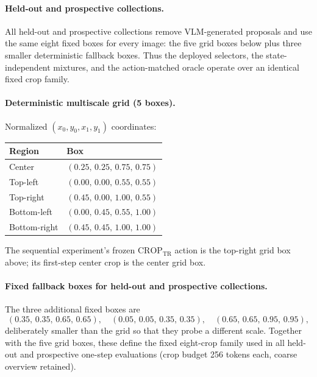 \documentclass[10pt]{article}
\begin{document}
\paragraph{Held-out and prospective collections.}
All held-out and prospective collections remove VLM-generated proposals and
use the same eight fixed boxes for every image: the five grid boxes below
plus three smaller deterministic fallback boxes. Thus the deployed selectors,
the state-independent mixtures, and the action-matched oracle operate over
an identical fixed crop family.

\paragraph{Deterministic multiscale grid (5 boxes).}
Normalized $(x_0, y_0, x_1, y_1)$ coordinates:
\begin{center}
\begin{tabular}{ll}
\toprule
Region & Box \\
\midrule
Center       & $(0.25,\,0.25,\,0.75,\,0.75)$ \\
Top-left     & $(0.00,\,0.00,\,0.55,\,0.55)$ \\
Top-right    & $(0.45,\,0.00,\,1.00,\,0.55)$ \\
Bottom-left  & $(0.00,\,0.45,\,0.55,\,1.00)$ \\
Bottom-right & $(0.45,\,0.45,\,1.00,\,1.00)$ \\
\bottomrule
\end{tabular}
\end{center}
The sequential experiment's frozen $\mathrm{CROP}_{\mathrm{TR}}$ action is
the top-right grid box above; its first-step center crop is the center grid
box.

\paragraph{Fixed fallback boxes for held-out and prospective collections.}
The three additional fixed boxes are
\[
(0.35,\,0.35,\,0.65,\,0.65),\quad
(0.05,\,0.05,\,0.35,\,0.35),\quad
(0.65,\,0.65,\,0.95,\,0.95),
\]
deliberately smaller than the grid so that they probe a different scale.
Together with the five grid boxes, these define the fixed eight-crop family
used in all held-out and prospective one-step evaluations (crop budget 256
tokens each, coarse overview retained).
\end{document}
